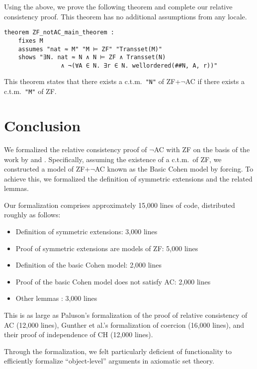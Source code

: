 \documentclass{report}
\newenvironment{isaframe}{\begin{mdframed}[topline=false, rightline=false, bottomline=false]}{\end{mdframed}}
\begin{document}
Using the above, we prove the following theorem and complete our relative consistency proof.
This theorem has no additional assumptions from any locale.
\begin{isaframe}
\begin{verbatim}
theorem ZF_notAC_main_theorem :
    fixes M 
    assumes "nat ≈ M" "M ⊨ ZF" "Transset(M)" 
    shows "∃N. nat ≈ N ∧ N ⊨ ZF ∧ Transset(N) 
                ∧ ¬(∀A ∈ N. ∃r ∈ N. wellordered(##N, A, r))" 
\end{verbatim}
\end{isaframe}
This theorem states that there exists a c.t.m.\ \texttt{"N"} of ZF+$\neg$AC if there exists a c.t.m.\ \texttt{"M"} of ZF.




\chapter{Conclusion} \label{chap:conclusion}

We formalized the relative consistency proof of $\neg$AC with ZF
on the basis of the work by \cite{paulson_AC_consistency} and \cite{gunther_forcing}.
Specifically, assuming the existence of a c.t.m.\ of ZF, 
we constructed a model of ZF+$\neg$AC known as the Basic Cohen model by forcing. 
To achieve this, we formalized the definition of symmetric extensions and the related lemmas.

Our formalization comprises approximately 15,000 lines of code, 
distributed roughly as follows:
\begin{itemize}
  \item Definition of symmetric extensions: 3,000 lines
  \item Proof of symmetric extensions are models of ZF: 5,000 lines
  \item Definition of the basic Cohen model: 2,000 lines
  \item Proof of the basic Cohen model does not satisfy AC: 2,000 lines
  \item Other lemmas : 3,000 lines
\end{itemize}
This is as large as Paluson's formalization of the proof of relative consistency of AC (12,000 lines), 
Gunther et al.'s formalization of coercion (16,000 lines), 
and their proof of independence of CH (12,000 lines).

Through the formalization, we felt particularly deficient of 
functionality to efficiently formalize “object-level” arguments in axiomatic set theory.
\end{document}
